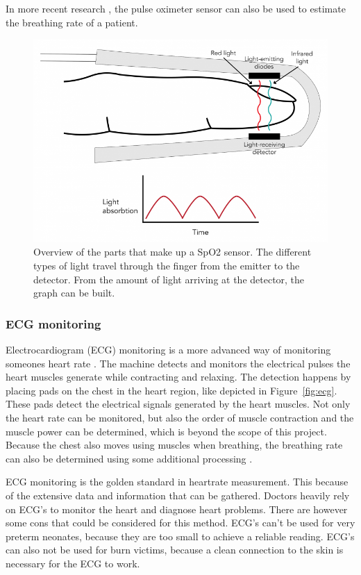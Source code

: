 In more recent research \cite{motin2019selection}, the pulse oximeter sensor can also be used to estimate the breathing rate of a patient. 

\begin{figure}[t]
\centering
\includegraphics[width=.7\textwidth]{figures/background/pulse_oximeter.png}
\caption{Overview of the parts that make up a SpO2 sensor. The different types of light travel through the finger from the emitter to the detector. From the amount of light arriving at the detector, the graph can be built.}
\label{fig:pulse_oxymeter}
\end{figure}

\subsubsection{ECG monitoring}
Electrocardiogram (ECG) monitoring is a more advanced way of monitoring someones heart rate \cite{berkaya2018survey}. The machine detects and monitors the electrical pulses the heart muscles generate while contracting and relaxing. The detection happens by placing pads on the chest in the heart region, like depicted in Figure~\ref{fig:ecg}. These pads detect the electrical signals generated by the heart muscles. Not only the heart rate can be monitored, but also the order of muscle contraction and the muscle power can be determined, which is beyond the scope of this project. Because the chest also moves using muscles when breathing, the breathing rate can also be determined using some additional processing \cite{charlton2017breathing}.

ECG monitoring is the golden standard in heartrate measurement. This because of the extensive data and information that can be gathered. Doctors heavily rely on ECG's to monitor the heart and diagnose heart problems. There are however some cons that could be considered for this method. ECG's can't be used for very preterm neonates, because they are too small to achieve a reliable reading. ECG's can also not be used for burn victims, because a clean connection to the skin is necessary for the ECG to work. 

